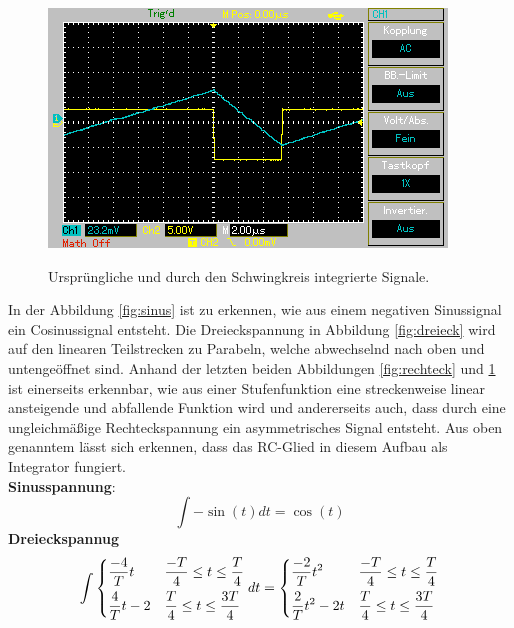 \begin{figure}[H]
\begin{minipage}{0.48\textwidth}
        \label{fig:rechteck}
        \vspace{1em}
        \includegraphics[width=\textwidth]{content/Grafiken/MAP004.png}
        \label{fig:pwm}
        \vspace{1em}
    \end{minipage}
    \caption{Ursprüngliche und durch den Schwingkreis integrierte Signale.}
\end{figure}
\noindent
In der Abbildung \ref{fig:sinus} ist zu erkennen, wie aus einem negativen Sinussignal ein Cosinussignal entsteht.
Die Dreieckspannung in Abbildung \ref{fig:dreieck} wird auf den linearen Teilstrecken zu Parabeln, welche abwechselnd nach oben und untengeöffnet sind.
Anhand der letzten beiden Abbildungen \ref{fig:rechteck} und \ref{fig:pwm} ist einerseits erkennbar, wie aus einer Stufenfunktion eine streckenweise linear ansteigende und abfallende Funktion wird und andererseits auch, dass durch eine ungleichmäßige Rechteckspannung ein asymmetrisches Signal entsteht.
Aus oben genanntem lässt sich erkennen, dass das RC-Glied in diesem Aufbau als Integrator fungiert.\\
\textbf{Sinusspannung}:
\begin{equation}
  \int - \sin(t) dt = \cos(t)
\end{equation}
\textbf{Dreieckspannug}
\begin{equation}
  \int \begin{dcases}
   \frac{-4}{T}t &  \frac{-T}{4}\leq t \leq \frac{T}{4}\\
   \frac{4}{T}t-2 & \frac{T}{4}\leq t \leq \frac{3T}{4}
 \end{dcases}
 dt = \begin{dcases}
  \frac{-2}{T}t^2 &  \frac{-T}{4}\leq t \leq \frac{T}{4}\\
  \frac{2}{T}t^2-2t & \frac{T}{4}\leq t \leq \frac{3T}{4}
\end{dcases}
\end{equation}

